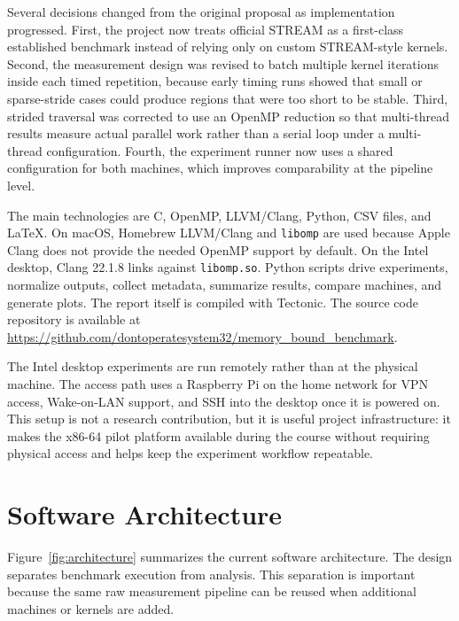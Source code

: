 \documentclass[11pt]{article}
\begin{document}
Several decisions changed from the original proposal as implementation progressed. First, the project now treats official STREAM as a first-class established benchmark instead of relying only on custom STREAM-style kernels. Second, the measurement design was revised to batch multiple kernel iterations inside each timed repetition, because early timing runs showed that small or sparse-stride cases could produce regions that were too short to be stable. Third, strided traversal was corrected to use an OpenMP reduction so that multi-thread results measure actual parallel work rather than a serial loop under a multi-thread configuration. Fourth, the experiment runner now uses a shared configuration for both machines, which improves comparability at the pipeline level.

The main technologies are C, OpenMP, LLVM/Clang, Python, CSV files, and LaTeX. On macOS, Homebrew LLVM/Clang and \texttt{libomp} are used because Apple Clang does not provide the needed OpenMP support by default. On the Intel desktop, Clang 22.1.8 links against \texttt{libomp.so}. Python scripts drive experiments, normalize outputs, collect metadata, summarize results, compare machines, and generate plots. The report itself is compiled with Tectonic. The source code repository is available at \url{https://github.com/dontoperatesystem32/memory_bound_benchmark}.

The Intel desktop experiments are run remotely rather than at the physical machine. The access path uses a Raspberry Pi on the home network for VPN access, Wake-on-LAN support, and SSH into the desktop once it is powered on. This setup is not a research contribution, but it is useful project infrastructure: it makes the x86-64 pilot platform available during the course without requiring physical access and helps keep the experiment workflow repeatable.

\section{Software Architecture}

Figure~\ref{fig:architecture} summarizes the current software architecture. The design separates benchmark execution from analysis. This separation is important because the same raw measurement pipeline can be reused when additional machines or kernels are added.
\end{document}
